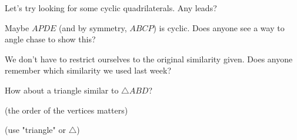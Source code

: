 




Let's try looking for some cyclic quadrilaterals. Any leads?






Maybe $APDE$ (and by symmetry, $ABCP$) is cyclic. Does anyone see a way to angle chase to show this?


We don't have to restrict ourselves to the original similarity given. Does anyone remember which similarity we used last week?

How about a triangle similar to $\triangle ABD$?

(the order of the vertices matters)

(use "triangle" or $\triangle$)




